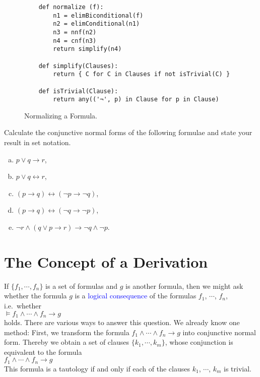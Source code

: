 \begin{figure}[!ht]
  \centering
\begin{verbatim}
    def normalize (f):
        n1 = elimBiconditional(f)
        n2 = elimConditional(n1)
        n3 = nnf(n2)
        n4 = cnf(n3)
        return simplify(n4)
    
    def simplify(Clauses):
        return { C for C in Clauses if not isTrivial(C) }
    
    def isTrivial(Clause):
        return any(('¬', p) in Clause for p in Clause)
\end{verbatim} 
\vspace*{-0.3cm}
  \caption{Normalizing a Formula.}
  \label{fig:normalize}
\end{figure}

\exerciseEng
Calculate the conjunctive normal forms of the following formulae and state your result in set notation.
\begin{enumerate}[(a)]
\item $p \vee q \rightarrow r$,
\item $p \vee q \leftrightarrow r$,
\item $(p \rightarrow q) \leftrightarrow (\neg p \rightarrow \neg q)$,
\item $(p \rightarrow q) \leftrightarrow (\neg q \rightarrow \neg p)$,
\item $\neg r \wedge (q \vee p \rightarrow r) \rightarrow \neg q \wedge \neg p$.
\end{enumerate}

\section{The Concept of a Derivation}
If $\{f_1,\cdots,f_n\}$ is a set of formulas and $g$ is another formula, then
we might ask whether the formula $g$ is a \textcolor{blue}{logical consequence} of the formulas $f_1$,
$\cdots$, $f_n$, i.e.~whether
\\[0.2cm]
\hspace*{1.3cm}
$\models f_1 \wedge \cdots \wedge f_n \rightarrow g$
\\[0.2cm]
holds.
There are various ways to answer this question.  We already know one method:
First, we transform the formula $f_1 \wedge \cdots \wedge f_n \rightarrow g$ into
conjunctive normal form.  Thereby we obtain a set of clauses
$\{k_1,\cdots,k_m\}$, whose conjunction is equivalent to the formula
\\[0.2cm]
\hspace*{1.3cm}
$f_1 \wedge \cdots \wedge f_n \rightarrow g$
\\[0.2cm]
This formula is a tautology if and only if each of the clauses $k_1$, $\cdots$, $k_m$ is trivial.

